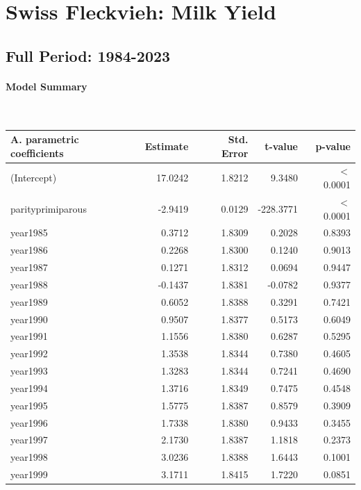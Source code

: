 \section{Swiss Fleckvieh: Milk Yield}
\subsection{Full Period: 1984-2023}\label{model:sf_milk_full}
\paragraph{Model Summary} \quad \\

    \begin{table}[H]
    \centering
    \begin{tabular}{lrrrr}
    \textbf{A. parametric coefficients} & Estimate & Std. Error & t-value & p-value \\ 
       \hline
       \hline
      (Intercept) & 17.0242 & 1.8212 & 9.3480 & $<$ 0.0001 \\ 
      parityprimiparous & -2.9419 & 0.0129 & -228.3771 & $<$ 0.0001 \\ 
      year1985 & 0.3712 & 1.8309 & 0.2028 & 0.8393 \\ 
      year1986 & 0.2268 & 1.8300 & 0.1240 & 0.9013 \\ 
      year1987 & 0.1271 & 1.8312 & 0.0694 & 0.9447 \\ 
      year1988 & -0.1437 & 1.8381 & -0.0782 & 0.9377 \\ 
      year1989 & 0.6052 & 1.8388 & 0.3291 & 0.7421 \\ 
      year1990 & 0.9507 & 1.8377 & 0.5173 & 0.6049 \\ 
      year1991 & 1.1556 & 1.8380 & 0.6287 & 0.5295 \\ 
      year1992 & 1.3538 & 1.8344 & 0.7380 & 0.4605 \\ 
      year1993 & 1.3283 & 1.8344 & 0.7241 & 0.4690 \\ 
      year1994 & 1.3716 & 1.8349 & 0.7475 & 0.4548 \\ 
      year1995 & 1.5775 & 1.8387 & 0.8579 & 0.3909 \\ 
      year1996 & 1.7338 & 1.8380 & 0.9433 & 0.3455 \\ 
      year1997 & 2.1730 & 1.8387 & 1.1818 & 0.2373 \\ 
      year1998 & 3.0236 & 1.8388 & 1.6443 & 0.1001 \\ 
      year1999 & 3.1711 & 1.8415 & 1.7220 & 0.0851 \\ 

\end{tabular}
\end{table}
